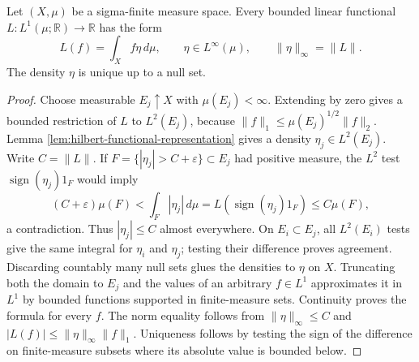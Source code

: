 \begin{proposition}\label{prop:real-lone-duality}
Let $(X,\mu)$ be a sigma-finite measure space. Every bounded linear functional $L:L^1(\mu;\mathbb R)\to\mathbb R$ has the form
\[
 L(f)=\int_X f\eta\,d\mu,\qquad \eta\in L^\infty(\mu),\qquad \|\eta\|_\infty=\|L\|.
\]
The density $\eta$ is unique up to a null set.
\end{proposition}
\begin{proof}
Choose measurable $E_j\uparrow X$ with $\mu(E_j)<\infty$. Extending by zero gives a bounded restriction of $L$ to $L^2(E_j)$, because $\|f\|_1\leq\mu(E_j)^{1/2}\|f\|_2$. Lemma \ref{lem:hilbert-functional-representation} gives a density $\eta_j\in L^2(E_j)$. Write $C=\|L\|$. If $F=\{|\eta_j|>C+\varepsilon\}\subset E_j$ had positive measure, the $L^2$ test $\operatorname{sign}(\eta_j)1_F$ would imply
\[
 (C+\varepsilon)\mu(F)<\int_F|\eta_j|\,d\mu
 =L(\operatorname{sign}(\eta_j)1_F)\leq C\mu(F),
\]
a contradiction. Thus $|\eta_j|\leq C$ almost everywhere. On $E_i\subset E_j$, all $L^2(E_i)$ tests give the same integral for $\eta_i$ and $\eta_j$; testing their difference proves agreement. Discarding countably many null sets glues the densities to $\eta$ on $X$. Truncating both the domain to $E_j$ and the values of an arbitrary $f\in L^1$ approximates it in $L^1$ by bounded functions supported in finite-measure sets. Continuity proves the formula for every $f$. The norm equality follows from $\|\eta\|_\infty\leq C$ and $|L(f)|\leq\|\eta\|_\infty\|f\|_1$. Uniqueness follows by testing the sign of the difference on finite-measure subsets where its absolute value is bounded below.
\end{proof}

